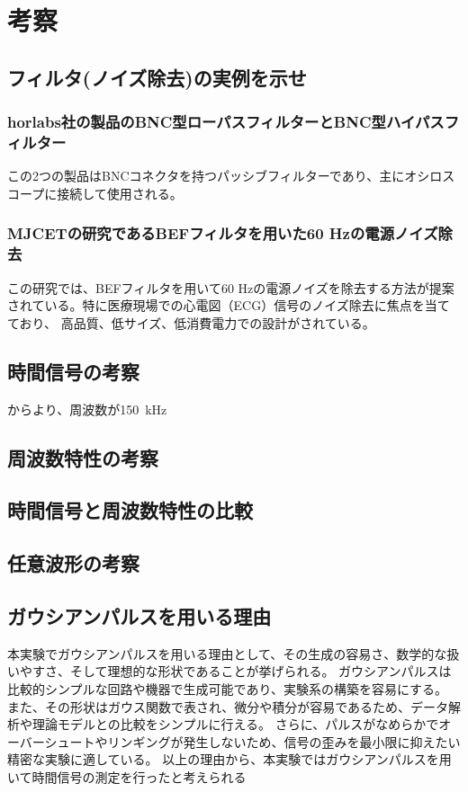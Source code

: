 \documentclass[11pt,dvipdfmx]{jarticle}
\begin{document}
\section{考察}
\subsection{フィルタ(ノイズ除去)の実例を示せ}

\subsubsection{horlabs社の製品のBNC型ローパスフィルターとBNC型ハイパスフィルター}
この2つの製品はBNCコネクタを持つパッシブフィルターであり、主にオシロスコープに接続して使用される。

\subsubsection{MJCETの研究であるBEFフィルタを用いた60 Hzの電源ノイズ除去}

この研究では、BEFフィルタを用いて60 Hzの電源ノイズを除去する方法が提案されている。特に医療現場での心電図（ECG）信号のノイズ除去に焦点を当てており、
高品質、低サイズ、低消費電力での設計がされている。

\subsection{時間信号の考察}
からより、周波数が150\ kHz
\subsection{周波数特性の考察}

\subsection{時間信号と周波数特性の比較}

\subsection{任意波形の考察}

\subsection{ガウシアンパルスを用いる理由}
本実験でガウシアンパルスを用いる理由として、その生成の容易さ、数学的な扱いやすさ、そして理想的な形状であることが挙げられる。
ガウシアンパルスは比較的シンプルな回路や機器で生成可能であり、実験系の構築を容易にする。
また、その形状はガウス関数で表され、微分や積分が容易であるため、データ解析や理論モデルとの比較をシンプルに行える。
さらに、パルスがなめらかでオーバーシュートやリンギングが発生しないため、信号の歪みを最小限に抑えたい精密な実験に適している。
以上の理由から、本実験ではガウシアンパルスを用いて時間信号の測定を行ったと考えられる
\end{document}
